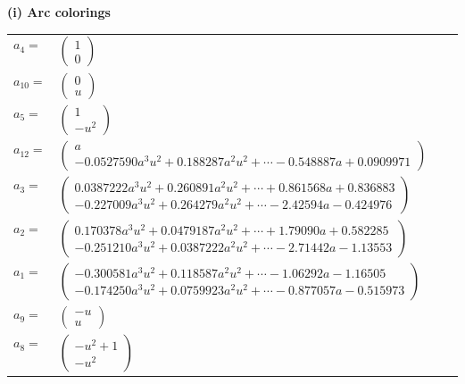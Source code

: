 \documentclass[1p]{elsarticle_modified}
\theoremstyle{definition}
\begin{document}
\flushleft \textbf{(i) Arc colorings}\\
\begin{tabular}{m{7pt} m{180pt} m{7pt} m{180pt} }
\flushright $a_{4}=$&$\begin{pmatrix}1\\0\end{pmatrix}$ \\
\flushright $a_{10}=$&$\begin{pmatrix}0\\u\end{pmatrix}$ \\
\flushright $a_{5}=$&$\begin{pmatrix}1\\- u^2\end{pmatrix}$ \\
\flushright $a_{12}=$&$\begin{pmatrix}a\\-0.0527590 a^{3} u^{2}+0.188287 a^{2} u^{2}+\cdots-0.548887 a+0.0909971\end{pmatrix}$ \\
\flushright $a_{3}=$&$\begin{pmatrix}0.0387222 a^{3} u^{2}+0.260891 a^{2} u^{2}+\cdots+0.861568 a+0.836883\\-0.227009 a^{3} u^{2}+0.264279 a^{2} u^{2}+\cdots-2.42594 a-0.424976\end{pmatrix}$ \\
\flushright $a_{2}=$&$\begin{pmatrix}0.170378 a^{3} u^{2}+0.0479187 a^{2} u^{2}+\cdots+1.79090 a+0.582285\\-0.251210 a^{3} u^{2}+0.0387222 a^{2} u^{2}+\cdots-2.71442 a-1.13553\end{pmatrix}$ \\
\flushright $a_{1}=$&$\begin{pmatrix}-0.300581 a^{3} u^{2}+0.118587 a^{2} u^{2}+\cdots-1.06292 a-1.16505\\-0.174250 a^{3} u^{2}+0.0759923 a^{2} u^{2}+\cdots-0.877057 a-0.515973\end{pmatrix}$ \\
\flushright $a_{9}=$&$\begin{pmatrix}- u\\u\end{pmatrix}$ \\
\flushright $a_{8}=$&$\begin{pmatrix}- u^2+1\\- u^2\end{pmatrix}$ \\

\end{tabular}
\end{document}
